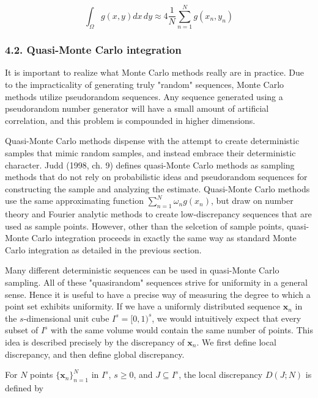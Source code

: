 \documentclass[11pt]{article}
\begin{document}
\begin{equation}\label{EqMontCarlIntPiCirc}
  \int_\Omega g(x,y)dx\,dy \approx 4\frac{1}{N}\sum_{n=1}^N g\left(x_n,y_n\right)
\end{equation}

    \subsubsection{4.2. Quasi-Monte Carlo
integration}\label{quasi-monte-carlo-integration}

It is important to realize what Monte Carlo methods really are in
practice. Due to the impracticality of generating truly "random"
sequences, Monte Carlo methods utilize pseudorandom sequences. Any
sequence generated using a pseudorandom number generator will have a
small amount of artificial correlation, and this problem is compounded
in higher dimensions.

Quasi-Monte Carlo methods dispense with the attempt to create
deterministic samples that mimic random samples, and instead embrace
their deterministic character. Judd (1998, ch. 9) defines quasi-Monte
Carlo methods as sampling methods that do not rely on probabilistic
ideas and pseudorandom sequences for constructing the sample and
analyzing the estimate. Quasi-Monte Carlo methods use the same
approximating function \(\sum_{n=1}^N\omega_n g(x_n)\), but draw on
number theory and Fourier analytic methods to create low-discrepancy
sequences that are used as sample points. However, other than the
selcetion of sample points, quasi-Monte Carlo integration proceeds in
exactly the same way as standard Monte Carlo integration as detailed in
the previous section.

Many different deterministic sequences can be used in quasi-Monte Carlo
sampling. All of these "quasirandom" sequences strive for uniformity in
a general sense. Hence it is useful to have a precise way of measuring
the degree to which a point set exhibits uniformity. If we have a
uniformly distributed sequence \(\mathbf{x}_n\) in the \(s\)-dimensional
unit cube \(I^s=[0,1)^s\), we would intuitively expect that every subset
of \(I^s\) with the same volume would contain the same number of points.
This idea is described precisely by the discrepancy of \(\mathbf{x}_n\).
We first define local discrepancy, and then define global discrepancy.

For \(N\) points \(\{\mathbf{x}_n\}_{n=1}^N\) in \(I^s\), \(s\geq0\),
and \(J\subseteq I^s\), the local discrepancy \(D(J;N)\) is defined by
\end{document}
